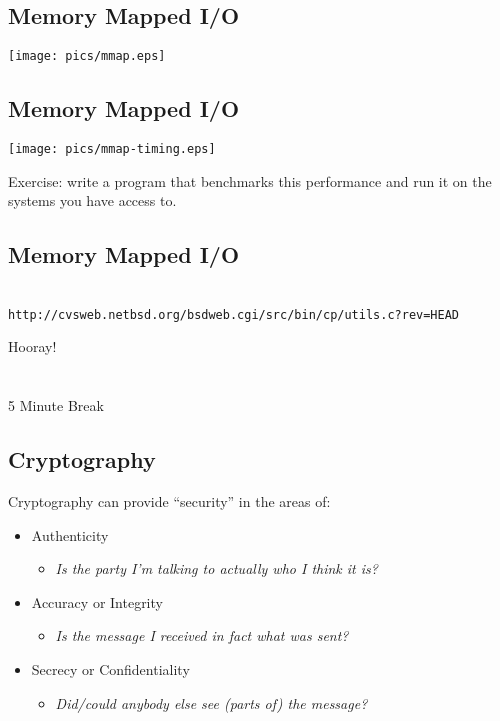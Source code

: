 \documentclass[xga]{xdvislides}
\begin{document}
\subsection{Memory Mapped I/O}
\begin{center}
	\texttt{[image: pics/mmap.eps]}
\end{center}

\subsection{Memory Mapped I/O}
\begin{center}
	\texttt{[image: pics/mmap-timing.eps]}
\end{center}
\addvspace{.5in}
Exercise: write a program that benchmarks this performance and run it on
the systems you have access to.

\subsection{Memory Mapped I/O}
\\
\vspace*{\fill}
\verb+http://cvsweb.netbsd.org/bsdweb.cgi/src/bin/cp/utils.c?rev=HEAD+
\vspace*{\fill}

\newpage
\vspace*{\fill}
\begin{center}
    \Hugesize
        Hooray! \\ [1em]
    \hspace*{5mm}
    \blueline\\
    \hspace*{5mm}\\
        5 Minute Break
\end{center}
\vspace*{\fill}

\subsection{Cryptography}
Cryptography can provide ``security'' in the areas of:
\begin{itemize}
	\item Authenticity
		\begin{itemize}
			\item {\em Is the party I'm talking to actually who I {\em think} it is?}
		\end{itemize}
	\item Accuracy or Integrity
		\begin{itemize}
			\item {\em Is the message I received in fact what was sent?}
		\end{itemize}
	\item Secrecy or Confidentiality
		\begin{itemize}
			\item {\em Did/could anybody else see (parts of) the message?}
		\end{itemize}
\end{itemize}
\end{document}
